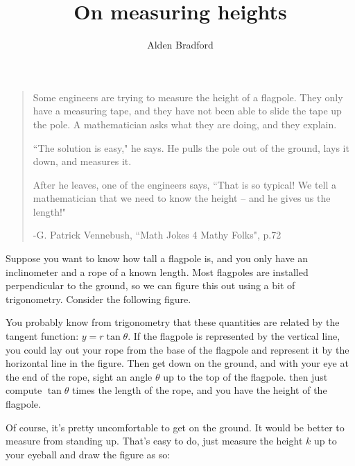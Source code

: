 \documentclass{article}
\title{On measuring heights}
\author{Alden Bradford}
\begin{document}
\maketitle

\begin{quote}
Some engineers are trying to measure the height of a flagpole. They only have a measuring tape, and they have not been able to slide the tape up the pole. A mathematician asks what they are doing, and they explain.

``The solution is easy," he says. He pulls the pole out of the ground, lays it down, and measures it.

After he leaves, one of the engineers says, ``That is so typical! We tell a mathematician that we need to know the height -- and he gives us the length!"

\hfill -G. Patrick Vennebush, ``Math Jokes 4 Mathy Folks", p.72
\end{quote}

Suppose you want to know how tall a flagpole is, and you only have an inclinometer and a rope of a known length. Most flagpoles are installed perpendicular to the ground, so we can figure this out using a bit of trigonometry. Consider the following figure.

\begin{figure}[h!]
\centering
{}
\end{figure}

You probably know from trigonometry that these quantities are related by the tangent function: $y = r \tan \theta$. If the flagpole is represented by the vertical line, you could lay out your rope from the base of the flagpole and represent it by the horizontal line in the figure. Then get down on the ground, and with your eye at the end of the rope, sight an angle $\theta$ up to the top of the flagpole. then just compute $\tan\theta$ times the length of the rope, and you have the height of the flagpole.

Of course, it's pretty uncomfortable to get on the ground. It would be better to measure from standing up. That's easy to do, just measure the height $k$ up to your eyeball and draw the figure as so:
\begin{figure}[h!]
\centering
{}
\end{figure}
\end{document}
